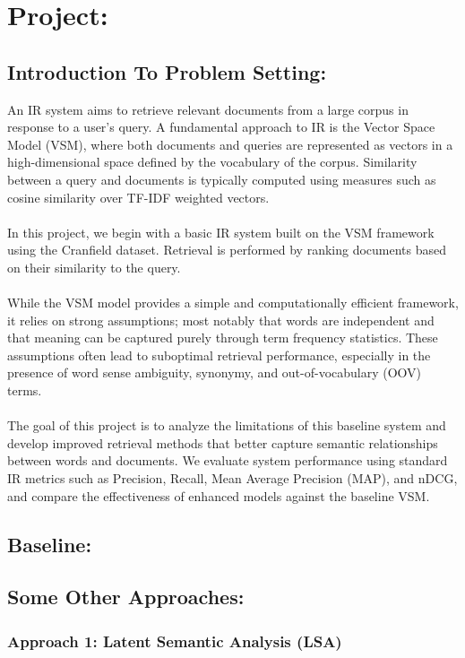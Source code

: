 \documentclass{article}
\begin{document}
\section{Project:}
\subsection{Introduction To Problem Setting:}
An IR system aims to retrieve relevant documents from a large corpus in response to a user’s query. A fundamental approach to IR is the Vector Space Model (VSM), where both documents and queries are represented as vectors in a high-dimensional space defined by the vocabulary of the corpus. Similarity between a query and documents is typically computed using measures such as cosine similarity over TF-IDF weighted vectors.\\ \\
In this project, we begin with a basic IR system built on the VSM framework using the Cranfield dataset. Retrieval is performed by ranking documents based on their similarity to the query.\\ \\
While the VSM model provides a simple and computationally efficient framework, it relies on strong assumptions; most notably that words are independent and that meaning can be captured purely through term frequency statistics. These assumptions often lead to suboptimal retrieval performance, especially in the presence of word sense ambiguity, synonymy, and out-of-vocabulary (OOV) terms.\\ \\
The goal of this project is to analyze the limitations of this baseline system and develop improved retrieval methods that better capture semantic relationships between words and documents. We evaluate system performance using standard IR metrics such as Precision, Recall, Mean Average Precision (MAP), and nDCG, and compare the effectiveness of enhanced models against the baseline VSM.

\subsection{Baseline:}
\subsection{Some Other Approaches: }
\subsubsection{Approach 1: Latent Semantic Analysis (LSA)}
\end{document}
